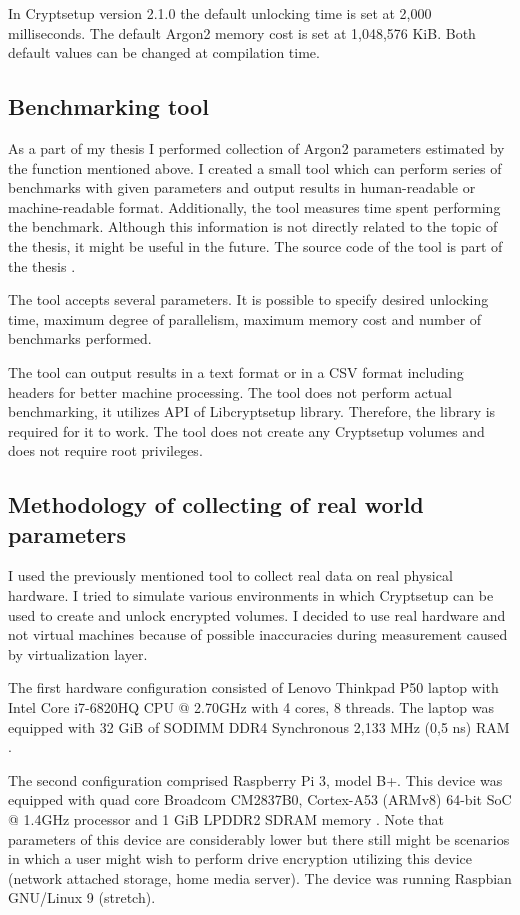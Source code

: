 \documentclass[nolof]{fithesis3}
\begin{document}
In Cryptsetup version 2.1.0 the default unlocking time is set at 2,000 milliseconds. The default Argon2 memory cost is set at 1,048,576 KiB. Both default values can be changed at compilation time.

\subsection{Benchmarking tool}
As a part of my thesis I performed collection of Argon2 parameters estimated by the function mentioned above. I created a small tool which can perform series of benchmarks with given parameters and output results in human-readable or machine-readable format. Additionally, the tool measures time spent performing the benchmark. Although this information is not directly related to the topic of the thesis, it might be useful in the future. The source code of the tool is part of the thesis \parencite{thesisrepo}.

The tool accepts several parameters. It is possible to specify desired unlocking time, maximum degree of parallelism, maximum memory cost and number of benchmarks performed.

The tool can output results in a text format or in a CSV format including headers for better machine processing. The tool does not perform actual benchmarking, it utilizes API of Libcryptsetup library. Therefore, the library is required for it to work. The tool does not create any Cryptsetup volumes and does not require root privileges.

\subsection{Methodology of collecting of real world parameters}
\label{subsec:laptop}
I used the previously mentioned tool to collect real data on real physical hardware. I tried to simulate various environments in which Cryptsetup can be used to create and unlock encrypted volumes. I decided to use real hardware and not virtual machines because of possible inaccuracies during measurement caused by virtualization layer.

The first hardware configuration consisted of Lenovo Thinkpad P50 laptop with Intel Core i7-6820HQ CPU @ 2.70GHz with 4 cores, 8 threads. The laptop was equipped with 32 GiB of SODIMM DDR4 Synchronous 2,133 MHz (0,5 ns) RAM \parencite{laptopspecs}.

The second configuration comprised Raspberry Pi 3, model B+. This device was equipped with quad core Broadcom CM2837B0, Cortex-A53 (ARMv8) 64-bit SoC @ 1.4GHz processor and 1 GiB LPDDR2 SDRAM memory \parencite{raspberryspecs}. Note that parameters of this device are considerably lower but there still might be scenarios in which a user might wish to perform drive encryption utilizing this device (network attached storage, home media server). The device was running Raspbian GNU/Linux 9 (stretch).
\end{document}
